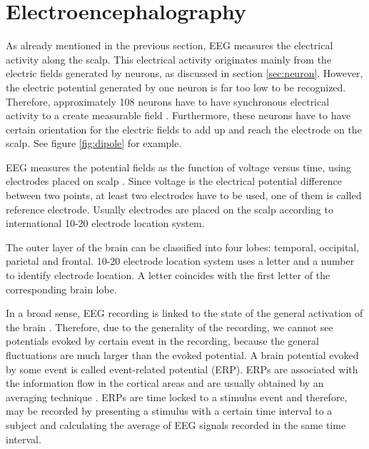 \section{Electroencephalography}
\label{sec:EEG}

As already mentioned in the previous section, \acrshort{EEG} measures the electrical activity along the scalp. This electrical activity originates mainly from the electric fields generated by neurons, as discussed in section \ref{sec:neuron}. However, the electric potential generated by one neuron is far too low to be recognized. Therefore, approximately 108 neurons have to have synchronous electrical activity to a create measurable field \cite{field_count}. Furthermore, these neurons have to have certain orientation for the electric fields to add up and reach the electrode on the scalp. See figure \ref{fig:dipole} for example.

\acrshort{EEG} measures the potential fields as the function of voltage versus time, using electrodes placed on scalp \cite{field_count}. Since voltage is the electrical potential difference between two points, at least two electrodes have to be used, one of them is called reference electrode. Usually electrodes are placed on the scalp according to international 10-20 electrode location system.

The outer layer of the brain can be classified into four lobes: temporal, occipital, parietal and frontal. 10-20 electrode location system uses a letter and a number to identify electrode location. A letter coincides with the first letter of the corresponding brain lobe.

In a broad sense, \acrshort{EEG} recording is linked to the state of the general activation of the brain \cite{VEP}. Therefore, due to the generality of the recording, we cannot see potentials evoked by certain event in the recording, because the general fluctuations are much larger than the evoked potential. A brain potential evoked by some event is called event-related potential (ERP). ERPs are associated with the information flow in the cortical areas and are usually obtained by an averaging technique \cite{ERP}. ERPs are time locked to a stimulus event and therefore, may be recorded by presenting a stimulus with a certain time interval to a subject and calculating the average of EEG signals recorded in the same time interval.

